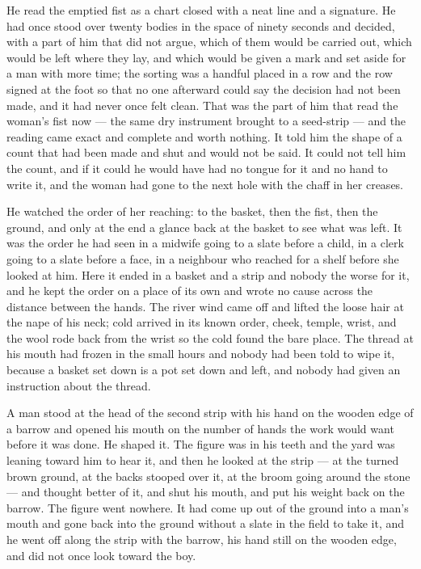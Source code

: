 He read the emptied fist as a chart closed with a neat line and a signature. He had once stood over twenty bodies in the space of ninety seconds and decided, with a part of him that did not argue, which of them would be carried out, which would be left where they lay, and which would be given a mark and set aside for a man with more time; the sorting was a handful placed in a row and the row signed at the foot so that no one afterward could say the decision had not been made, and it had never once felt clean. That was the part of him that read the woman's fist now --- the same dry instrument brought to a seed-strip --- and the reading came exact and complete and worth nothing. It told him the shape of a count that had been made and shut and would not be said. It could not tell him the count, and if it could he would have had no tongue for it and no hand to write it, and the woman had gone to the next hole with the chaff in her creases.

He watched the order of her reaching: to the basket, then the fist, then the ground, and only at the end a glance back at the basket to see what was left. It was the order he had seen in a midwife going to a slate before a child, in a clerk going to a slate before a face, in a neighbour who reached for a shelf before she looked at him. Here it ended in a basket and a strip and nobody the worse for it, and he kept the order on a place of its own and wrote no cause across the distance between the hands. The river wind came off  and lifted the loose hair at the nape of his neck; cold arrived in its known order, cheek, temple, wrist, and the wool rode back from the wrist so the cold found the bare place. The thread at his mouth had frozen in the small hours and nobody had been told to wipe it, because a basket set down is a pot set down and left, and nobody had given an instruction about the thread.

\scenebreak

A man stood at the head of the second strip with his hand on the wooden edge of a barrow and opened his mouth on the number of hands the work would want before it was done. He shaped it. The figure was in his teeth and the yard was leaning toward him to hear it, and then he looked at the strip --- at the turned brown ground, at the backs stooped over it, at the broom going around the stone --- and thought better of it, and shut his mouth, and put his weight back on the barrow. The figure went nowhere. It had come up out of the ground into a man's mouth and gone back into the ground without a slate in the field to take it, and he went off along the strip with the barrow, his hand still on the wooden edge, and did not once look toward the boy.

